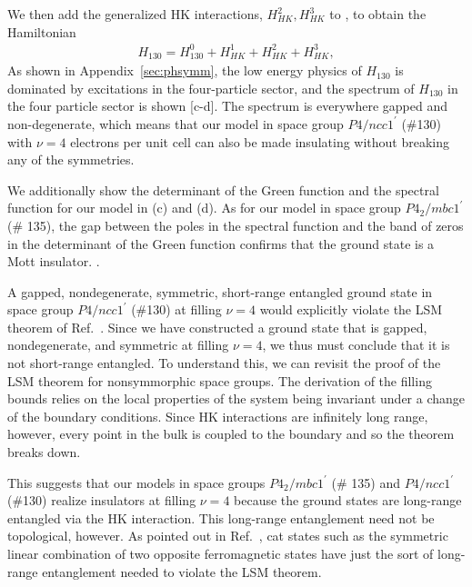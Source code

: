 \documentclass[prb,aps,amssymb,twocolumn,notitlepage]{revtex4-2}
\begin{document}
We then add the generalized HK interactions, $H^{2}_{HK},H^{3}_{HK}$ to , to obtain the Hamiltonian
\begin{align}
\label{eq:130fullinteractingH}
H_{130}=H^{0}_{130}+H^{1}_{HK}+H^2_{HK}+H^{3}_{HK},
\end{align}
As shown in Appendix~\ref{sec:phsymm}, the low energy physics of $H_{130}$ is dominated by excitations in the four-particle sector, and the spectrum of $H_{130}$ in the four particle sector is shown [c-d]. 
The spectrum is everywhere gapped and non-degenerate, which means that our model in space group $P4/ncc1^\prime$ (\#130) with $\nu=4$ electrons per unit cell can also be made insulating without breaking any of the symmetries.

We additionally show the determinant of the Green function and the spectral function for our model in (c) and (d). 
As for our model in space group $P4_2/mbc1^\prime$ (\# 135), the gap between the poles in the spectral function and the band of zeros in the determinant of the Green function confirms that the ground state is a Mott insulator.
.

A gapped, nondegenerate, symmetric, short-range entangled ground state in space group $P4/ncc1^\prime$ (\#130) at filling $\nu=4$ would explicitly violate the LSM theorem of Ref.~\cite{watanabe2015filling}. 
Since we have constructed a ground state that is gapped, nondegenerate, and symmetric at filling $\nu=4$, we thus must conclude that it is not short-range entangled. 
To understand this, we can revisit the proof of the LSM theorem for nonsymmorphic space groups. 
The derivation of the filling bounds relies on the local properties of the system being invariant under a change of the boundary conditions. 
Since HK interactions are infinitely long range, however, every point in the bulk is coupled to the boundary and so the theorem breaks down. 

This suggests that our models in space groups $P4_2/mbc1^\prime$ (\# 135) and $P4/ncc1^\prime$ (\#130) realize insulators at filling $\nu=4$ because the ground states are long-range entangled via the HK interaction. 
This long-range entanglement need not be topological, however. 
As pointed out in Ref.~\cite{watanabe2015filling}, cat states such as the symmetric linear combination of two opposite ferromagnetic states have just the sort of long-range entanglement needed to violate the LSM theorem.
\end{document}
